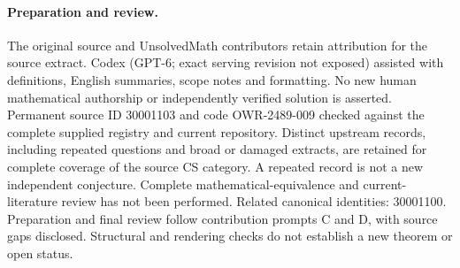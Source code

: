 \documentclass[11pt]{article}
\begin{document}
\paragraph{Preparation and review.}
The original source and UnsolvedMath contributors retain attribution for the source extract. Codex (GPT-6; exact serving revision not exposed) assisted with definitions, English summaries, scope notes and formatting. No new human mathematical authorship or independently verified solution is asserted. Permanent source ID 30001103 and code OWR-2489-009 checked against the complete supplied registry and current repository. Distinct upstream records, including repeated questions and broad or damaged extracts, are retained for complete coverage of the source CS category. A repeated record is not a new independent conjecture. Complete mathematical-equivalence and current-literature review has not been performed. Related canonical identities: 30001100. Preparation and final review follow contribution prompts C and D, with source gaps disclosed. Structural and rendering checks do not establish a new theorem or open status.
\label{end:30001103}
\end{document}
